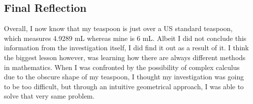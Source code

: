 \documentclass[12pt]{article}
\begin{document}
\subsection{Final Reflection}

Overall, I now know that my teaspoon is just over a US standard teaspoon, which measures 4.9289 mL whereas mine is 6 mL. Albeit I did not conclude this information from the investigation itself, I did find it out as a result of it. I think the biggest lesson however, was learning how there are always different methods in mathematics. When I was confronted by the possibility of complex calculus due to the obscure shape of my teaspoon, I thought my investigation was going to be too difficult, but through an intuitive geometrical approach, I was able to solve that very same problem.

\pagebreak

\printbibliography
\end{document}
